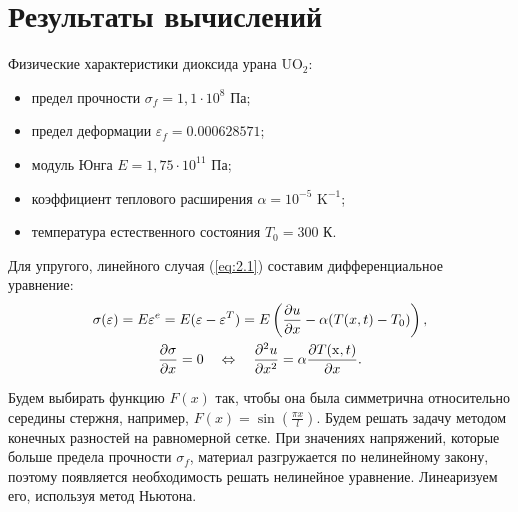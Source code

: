 \documentclass[12pt, a4paper]{article}
\begin{document}
\section{Результаты вычислений}
Физические характеристики диоксида урана UO$_2$: 
\begin{itemize}
\item предел прочности $\sigma_f = 1,1\cdot 10^8$ Па;
\item предел деформации $\varepsilon_f=0.000628571$;
\item модуль Юнга $E = 1,75\cdot 10^{11}$ Па;
\item коэффициент теплового расширения $\alpha = 10^{-5}\text{ K}^{-1}$;
\item температура естественного состояния $T_0 = 300$ К.
\end{itemize}
Для упругого, линейного случая (\ref{eq:2.1}) составим дифференциальное уравнение:
\begin{gather*}
	\sigma(\varepsilon) = E\varepsilon^e=E(\varepsilon-\varepsilon^T)=E\left(\frac{\partial u}{\partial x}-\alpha(T(x,t)-T_0)\right),\\
\frac{\partial \sigma}{\partial x} = 0 \quad \Leftrightarrow \quad \frac{\partial^2u}{\partial x^2} = \alpha \frac{\partial T(\mathrm x,t)}{\partial x}.
\end{gather*}

Будем выбирать функцию $F(x)$ так, чтобы она была симметрична относительно середины стержня, например, $F(x) = \sin(\frac{\pi x}{l})$. Будем решать задачу методом конечных разностей на равномерной сетке. При значениях напряжений, которые больше предела прочности $\sigma_f$, материал разгружается по нелинейному закону, поэтому появляется необходимость решать нелинейное уравнение. Линеаризуем его, используя метод Ньютона.
\end{document}
